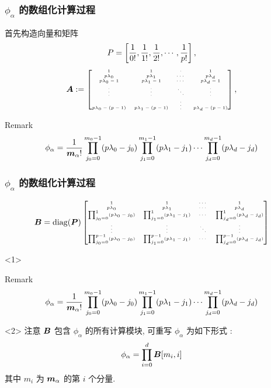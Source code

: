 \documentclass{beamer}
\numberwithin{subsection}{section}
\begin{document}
\begin{frame}
    \frametitle{$\phi_\alpha$ 的数组化计算过程}
首先构造向量和矩阵
\begin{equation*}
    \tiny
    P = \left[\frac{1}{0!}, \frac{1}{1!}, \frac{1}{2!}, \cdots, \frac{1}{p!}\right],
\end{equation*}
$$
\tiny
{\boldsymbol A} :=                                                                            
\begin{bmatrix}  
1  &  1  & \cdot & 1 \\
p\lambda_0 & p\lambda_1 & \cdots & p\lambda_d\\                                             
p\lambda_0 - 1 & p\lambda_1 - 1 & \cdots & p\lambda_d - 1\\   
\vdots & \vdots & \ddots & \vdots \\                                                     
p\lambda_0 - (p - 1) & p\lambda_1 - (p - 1) & \vdots & p\lambda_d - (p - 1)
\end{bmatrix},
$$
\begin{block}{Remark}
$$
 \phi_{\alpha} = \frac{1}{{\boldsymbol m}_\alpha!}\prod_{j_0 = 0}^{m_0 - 1} (p\lambda_0 -
 j_0) \prod_{j_1 = 0}^{m_1 - 1} (p\lambda_1 - j_1)\cdots\prod_{j_d = 0}^{m_d -
 1} (p\lambda_d - j_d)
$$
\end{block}
\end{frame}

\begin{frame}
    \frametitle{$\phi_\alpha$ 的数组化计算过程}
$$
\tiny
{\boldsymbol B} = \mathrm{diag}({\boldsymbol P})
\begin{bmatrix}
1 & 1 & \cdots & 1 \\
p\lambda_0 & p\lambda_1 & \cdots & p\lambda_d\\
\prod_{j_0=0}^{1}(p\lambda_0 - j_0) & 
\prod_{j_1=0}^{1}(p\lambda_1 - j_1) &
\cdots &
\prod_{j_d=0}^{1}(p\lambda_d - j_d) \\
\vdots & \vdots & \ddots & \vdots \\
\prod_{j_0=0}^{p-1}(p\lambda_0 - j_0) &
\prod_{j_1=0}^{p-1}(p\lambda_1 - j_1) &
\cdots & 
\prod_{j_d=0}^{p-1}(p\lambda_d - j_d)
\end{bmatrix}
$$
\begin{onlyenv}<1>
\begin{block}{Remark}
$$
 \phi_{\alpha} = 
 \frac{1}{{\boldsymbol m}_\alpha!}
 \prod_{j_0 = 0}^{m_0 - 1} (p\lambda_0 - j_0)
 \prod_{j_1 = 0}^{m_1 - 1} (p\lambda_1 - j_1)
 \cdots
 \prod_{j_d = 0}^{m_{d} - 1} (p\lambda_d - j_d)
$$
\end{block}
\end{onlyenv}
\begin{onlyenv}<2>
注意 ${\boldsymbol B}$ 包含 $\phi_\alpha$ 的所有计算模块, 可重写  $\phi_\alpha$ 为如下形式
:
\begin{equation*}
    \phi_\alpha = \prod_{i=0}^d{\boldsymbol B}[m_i, i]
\end{equation*}
其中 $m_i$ 为 ${\boldsymbol m}_\alpha$ 的第 $i$ 个分量.
\end{onlyenv}
\end{frame}
\end{document}
